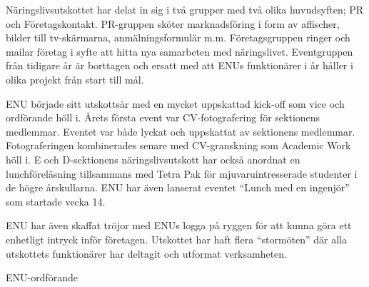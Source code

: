 \documentclass[../_main/handlingar.tex]{subfiles}
\begin{document}

Näringslivsutskottet har delat in sig i två grupper med två olika huvudsyften; PR och Företagskontakt. PR-gruppen sköter marknadsföring i form av affischer, bilder till tv-skärmarna, anmälningsformulär m.m. Företagsgruppen ringer och mailar företag i syfte att hitta nya samarbeten med näringslivet. Eventgruppen från tidigare år är borttagen och ersatt med att ENUs funktionärer i år håller i olika projekt från start till mål.

ENU började sitt utskottsår med en mycket uppskattad kick-off som vice och ordförande höll i. Årets första event var CV-fotografering för sektionens medlemmar. Eventet var både lyckat och uppskattat av sektionens medlemmar. Fotograferingen kombinerades senare med CV-granskning som Academic Work höll i. E och D-sektionens näringslivsutskott har också anordnat en lunchföreläsning tillsammans med Tetra Pak för mjuvaruintresserade studenter i de högre årskullarna. ENU har även lanserat eventet ``Lunch med en ingenjör'' som startade vecka 14.

ENU har även skaffat tröjor med ENUs logga på ryggen för att kunna göra ett enhetligt intryck inför företagen. Utskottet har haft flera ``stormöten'' där alla utskottets funktionärer har deltagit och utformat verksamheten.

\begin{signatures}{1}
    \mvh
    \signature{Johannes Koch}{ENU-ordförande}
\end{signatures}
\end{document}
